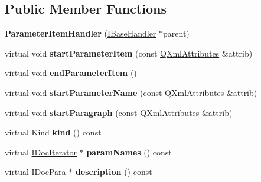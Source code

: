 \subsection*{Public Member Functions}
\begin{DoxyCompactItemize}
\item 
\mbox{\label{class_parameter_item_handler_a4f3da4ca7c83c430d848ca33e2e22e07}} 
{\bfseries Parameter\+Item\+Handler} (\mbox{\hyperlink{class_i_base_handler}{I\+Base\+Handler}} $\ast$parent)
\item 
\mbox{\label{class_parameter_item_handler_a64d1adb37b25641056b99832856c00ae}} 
virtual void {\bfseries start\+Parameter\+Item} (const \mbox{\hyperlink{class_q_xml_attributes}{Q\+Xml\+Attributes}} \&attrib)
\item 
\mbox{\label{class_parameter_item_handler_aa0556ee54c289e8d2a323a7c59a08ea7}} 
virtual void {\bfseries end\+Parameter\+Item} ()
\item 
\mbox{\label{class_parameter_item_handler_a3bda3c58f6e5ba7268c3d1ef5a62bc79}} 
virtual void {\bfseries start\+Parameter\+Name} (const \mbox{\hyperlink{class_q_xml_attributes}{Q\+Xml\+Attributes}} \&attrib)
\item 
\mbox{\label{class_parameter_item_handler_ae9858c194425b51fc217c48ba684fdfa}} 
virtual void {\bfseries start\+Paragraph} (const \mbox{\hyperlink{class_q_xml_attributes}{Q\+Xml\+Attributes}} \&attrib)
\item 
\mbox{\label{class_parameter_item_handler_a9394e4d64f76c045bcfe35cc73c882be}} 
virtual Kind {\bfseries kind} () const
\item 
\mbox{\label{class_parameter_item_handler_aa9a6cb22ed619ee33d077c1b41e7574c}} 
virtual \mbox{\hyperlink{class_i_doc_iterator}{I\+Doc\+Iterator}} $\ast$ {\bfseries param\+Names} () const
\item 
\mbox{\label{class_parameter_item_handler_ae198c8078fea99daaab27a2945c4608a}} 
virtual \mbox{\hyperlink{class_i_doc_para}{I\+Doc\+Para}} $\ast$ {\bfseries description} () const
\end{DoxyCompactItemize}
